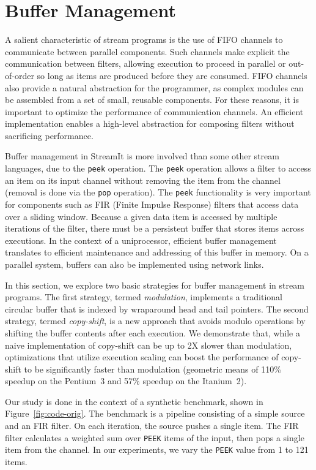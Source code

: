 \section{Buffer Management}
\label{sec:buffer}

A salient characteristic of stream programs is the use of FIFO
channels to communicate between parallel components.  Such channels
make explicit the communication between filters, allowing execution to
proceed in parallel or out-of-order so long as items are produced
before they are consumed.  FIFO channels also provide a natural
abstraction for the programmer, as complex modules can be assembled
from a set of small, reusable components.  For these reasons, it is
important to optimize the performance of communication channels.  An
efficient implementation enables a high-level abstraction for
composing filters without sacrificing performance.

Buffer management in StreamIt is more involved than some other stream
languages, due to the {\tt peek} operation.  The {\tt peek} operation
allows a filter to access an item on its input channel without
removing the item from the channel (removal is done via the {\tt pop}
operation).  The {\tt peek} functionality is very important for
components such as FIR (Finite Impulse Response) filters that access
data over a sliding window.  Because a given data item is accessed by
multiple iterations of the filter, there must be a persistent buffer
that stores items across executions.  In the context of a
uniprocessor, efficient buffer management translates to efficient
maintenance and addressing of this buffer in memory.  On a parallel
system, buffers can also be implemented using network links.

In this section, we explore two basic strategies for buffer management
in stream programs.  The first strategy, termed {\it modulation},
implements a traditional circular buffer that is indexed by wraparound
head and tail pointers.  The second strategy, termed {\it copy-shift},
is a new approach that avoids modulo operations by shifting the buffer
contents after each execution.  We demonstrate that, while a naive
implementation of copy-shift can be up to 2X slower than modulation,
optimizations that utilize execution scaling can boost the performance
of copy-shift to be significantly faster than modulation (geometric
means of 110\% speedup on the Pentium~3 and 57\% speedup on the
Itanium~2).



Our study is done in the context of a synthetic benchmark, shown in
Figure~\ref{fig:code-orig}.  
The benchmark is a pipeline consisting of a simple source and an FIR
filter.  On each iteration, the source pushes a single item.  The FIR
filter calculates a weighted sum over {\tt PEEK} items of the input,
then pops a single item from the channel.  In our experiments, we vary
the {\tt PEEK} value from 1 to 121 items.

